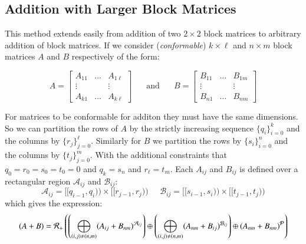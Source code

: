 \subsection{Addition with Larger Block Matrices}
This method extends easily from addition of two $2\times 2$ block matrices to arbitrary addition of block matrices.
If we consider (\emph{conformable}) $k \times \ell$ and $n \times m$ block matrices $A$ and $B$ respectively of the form:

\begin{equation*}
	A = \begin{bmatrix}
		A_{11} & \ldots & A_{1\ell}\\
		\vdots & & \vdots \\
		A_{k1} & \ldots & A_{k\ell}	
	\end{bmatrix}
	\;\;\;\;\;
	\text{ and }
	\;\;\;\;\;
	B = \begin{bmatrix}
		B_{11} & \ldots & B_{1m}\\
		\vdots & & \vdots \\
		B_{n1} & \ldots & B_{nm}	
	\end{bmatrix}
\end{equation*}

For matrices to be conformable for additon they must have the same dimensions.
So we can partition the rows of $A$ by the strictly increasing sequence $\{q_i\}_{i=0}^k$ and 
the columns by $\{r_j \}_{j=0}^\ell$.
Similarly for $B$ we partition the rows by $\{s_i\}_{i=0}^n$ and the columns by $\{t_j\}_{j=0}^m$.
With the additional constraints that ${q_0 = r_0 = s_0 = t_0 = 0}$ and $q_k = s_n$ and $r_\ell = t_m$.
Each $A_{ij}$ and $B_{ij}$ is defined over a rectangular region $\mathcal{A}_{ij}$ and $\mathcal{B}_{ij}$:
 \begin{equation*}
	\mathcal{A}_{ij} = [\![q_{i-1}, q_i )\!) \times [\![ r_{j-1}, r_{j} )\!)
	\;\;\;\;\;
	\mathcal{B}_{ij} = [\![s_{i-1}, s_i )\!) \times [\![ t_{j-1}, t_{j} )\!)
\end{equation*}
which gives the expression:
\begin{equation}
	(A+B) = \R[+] \left( 
		\left( \bigoplus_{(i,j) \neq (n,m)} (A_{ij} + B_{nm})^{\mathcal{A}_{ij}} \right) \oplus
		\left( \bigoplus_{(i,j) \neq (n,m)} (A_{nm} + B_{ij})^{\mathcal{B}_{ij}} \right) \oplus
			(A_{nm} + B_{nm})^{\mathcal{P}} 
	\right)
\end{equation}




%
